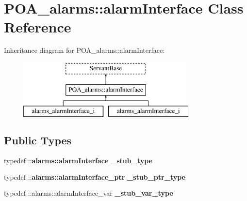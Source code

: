 \section{P\+O\+A\+\_\+alarms\+:\+:alarm\+Interface Class Reference}
\label{classPOA__alarms_1_1alarmInterface}
Inheritance diagram for P\+O\+A\+\_\+alarms\+:\+:alarm\+Interface\+:\begin{figure}[H]
\begin{center}
\leavevmode
\includegraphics[height=3.000000cm]{classPOA__alarms_1_1alarmInterface}
\end{center}
\end{figure}
\subsection*{Public Types}
\begin{DoxyCompactItemize}
\item 
typedef \+::{\bf alarms\+::alarm\+Interface} {\bfseries \+\_\+stub\+\_\+type}\label{classPOA__alarms_1_1alarmInterface_a19c4d001c7378df3cd7780f496a92df1}

\item 
typedef \+::{\bf alarms\+::alarm\+Interface\+\_\+ptr} {\bfseries \+\_\+stub\+\_\+ptr\+\_\+type}\label{classPOA__alarms_1_1alarmInterface_a0be83487e2b62c501cc02be879ddad99}

\item 
typedef \+::alarms\+::alarm\+Interface\+\_\+var {\bfseries \+\_\+stub\+\_\+var\+\_\+type}\label{classPOA__alarms_1_1alarmInterface_a7df076c41d2a69ba44c14d8301595178}

\end{DoxyCompactItemize}
